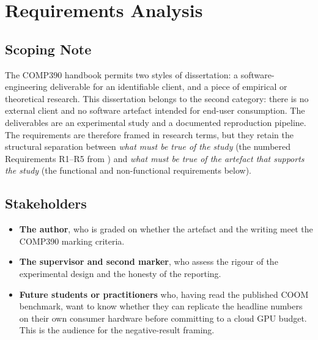 \chapter{Requirements Analysis}
\label{ch:reqs}

\section{Scoping Note}

The COMP390 handbook permits two styles of dissertation: a
software-engineering deliverable for an identifiable client, and a
piece of empirical or theoretical research. This dissertation belongs
to the second category: there is no external client and no software
artefact intended for end-user consumption. The deliverables are an
experimental study and a documented reproduction pipeline. The
requirements are therefore framed in research terms, but they retain
the structural separation between \emph{what must be true of the
study} (the numbered Requirements R1--R5 from
) and \emph{what must be true of the artefact that
supports the study} (the functional and non-functional
requirements below).

\section{Stakeholders}
\label{sec:stakeholders}

\begin{itemize}
    \item \textbf{The author}, who is graded on whether the
        artefact and the writing meet the COMP390 marking criteria.
    \item \textbf{The supervisor and second marker}, who assess the
        rigour of the experimental design and the honesty of the
        reporting.
    \item \textbf{Future students or practitioners} who, having read
        the published COOM benchmark, want to know whether they can
        replicate the headline numbers on their own consumer hardware
        before committing to a cloud GPU budget. This is the audience
        for the negative-result framing.
\end{itemize}

